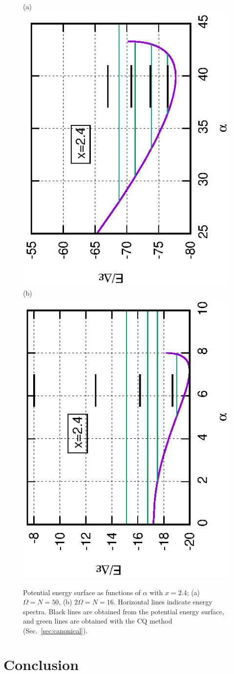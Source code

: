 \documentclass[%
superscriptaddress,
preprint,
showpacs,
nofootinbib,
amsmath,amssymb,
aps,
prc,
floatfix ]%
{revtex4-1}
\begin{document}
\begin{figure}[tb]
 \begin{center}
(a)  \includegraphics[height=0.46\textwidth,angle=-90]{images/N50Xeq2p4gap_E(2).eps}
(b)  \includegraphics[height=0.46\textwidth,angle=-90]{images/N16Xeq2p4gap_E(2).eps}
 \end{center}
\caption{Potential energy surface as functions of $\alpha$ with $x=2.4$;
(a) $\Omega=N=50$,
(b) $2\Omega=N=16$.
Horizontal lines 
indicate energy spectra. Black lines are obtained
from the potential energy surface, and green lines are 
obtained with the CQ method
(Sec.~\ref{sec:canonical}).
}
 \label{fig:Delta_E}
\end{figure}

\newpage


\section{Conclusion}
\label{sec:conclusion}
\end{document}
